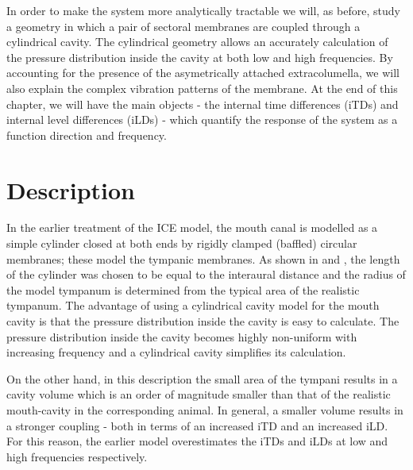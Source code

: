 In order to make the system more analytically tractable we will, as before, study a geometry in which a pair of sectoral
membranes are coupled through a cylindrical cavity. The cylindrical geometry allows an accurately calculation of the 
pressure distribution inside the cavity at both low and high frequencies. By accounting for the presence of the asymetrically attached
extracolumella, we will also explain the complex vibration patterns of the membrane. At the end of this chapter, we will
have the main objects - the internal time differences (iTDs) and internal level differences (iLDs) - which 
quantify the response of the system as a function direction and frequency.

\section{Description}
In the earlier treatment of the ICE model, the mouth canal is modelled as a simple cylinder closed at 
both ends by rigidly clamped (baffled) circular membranes; these model the tympanic membranes. As shown 
in \cite{vossenthesis} and \cite{vossenjasa}, the length of the cylinder was chosen to be equal to the interaural distance and the radius of the model tympanum is
determined from the typical area of the realistic tympanum. The advantage of using a cylindrical cavity model for the mouth cavity is that the pressure
distribution inside the cavity is easy to calculate. The pressure distribution inside the cavity becomes highly non-uniform 
with increasing frequency and a cylindrical cavity simplifies its calculation. 

On the other hand, in this description the small area of the tympani results in a cavity volume which 
is an order of magnitude smaller than that of the realistic mouth-cavity in the corresponding animal. In general, a smaller volume results in a stronger coupling - both in terms of an increased iTD and an increased
iLD. For this reason, the earlier model overestimates the iTDs and iLDs at
low and high frequencies respectively.

